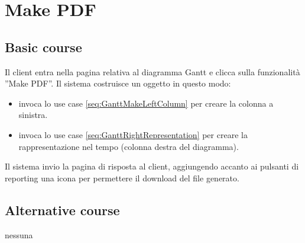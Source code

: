 \section{Make PDF}
\label{seq:GanttMakePDF}

\subsection{Basic course}
Il client entra nella pagina relativa al diagramma Gantt e clicca sulla 
funzionalit\`a ''Make PDF''. Il sistema costruisce un oggetto in questo modo:
\begin{itemize}
  \item invoca lo use case \ref{seq:GanttMakeLeftColumn} per creare la
  colonna a sinistra.
  \item invoca lo use case \ref{seq:GanttRightRepresentation} per creare
  la rappresentazione nel tempo (colonna destra del diagramma).
\end{itemize}
Il sistema invio la pagina di risposta al client, aggiungendo accanto ai
pulsanti di reporting una icona per permettere il download del file generato.  

\subsection{Alternative course}
\begin{description}
\item[nessuna]
\end{description}

